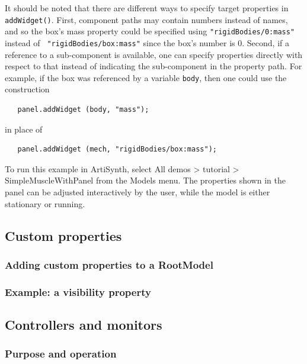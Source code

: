 \begin{sideblock}
It should be noted that there are different ways to specify target
properties in {\tt addWidget()}. First, component paths may contain
numbers instead of names, and so the box's mass property could be
specified using {\tt "rigidBodies/0:mass"} instead of {\tt
"rigidBodies/box:mass"} since the box's number is 0. Second, if a
reference to a sub-component is available, one can specify properties
directly with respect to that instead of indicating the sub-component
in the property path. For example, if the box was referenced by a
variable {\tt body}, then one could use the construction
%
\begin{verbatim}
   panel.addWidget (body, "mass");
\end{verbatim}
%
in place of 
%
\begin{verbatim}
   panel.addWidget (mech, "rigidBodies/box:mass");
\end{verbatim}
%
\end{sideblock}

To run this example in ArtiSynth, select {\sf All demos > tutorial >
SimpleMuscleWithPanel} from the {\sf Models} menu. The properties 
shown in the panel can be adjusted interactively by the user,
while the model is either stationary or running.

\subsection{Custom properties}
\label{CustomProperties:sec}

\subsubsection{Adding custom properties to a RootModel}

\subsubsection{Example: a visibility property}


\subsection{Controllers and monitors}

\subsubsection{Purpose and operation}

